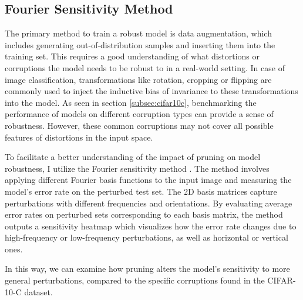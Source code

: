 \subsection{Fourier Sensitivity Method}\label{sec:fourier}

The primary method to train a robust model is data augmentation, which includes generating out-of-distribution samples and inserting them
into the training set. This requires a good understanding of what distortions or corruptions the model needs to be robust to in a real-world setting.
In case of image classification, transformations like rotation, cropping or flipping are commonly used to inject the inductive bias of invariance to these
transformations into the model. As seen in section \ref{subsec:cifar10c}, benchmarking the performance of models on different corruption types can provide
a sense of robustness. However, these common corruptions may not cover all possible features of distortions in the input space. 

To facilitate a better understanding of the impact of pruning on model robustness, I utilize the Fourier sensitivity method \cite{fourier_analysis}. 
The method involves applying different Fourier basis functions to the input image and measuring the model's error rate on the perturbed test set.  
The 2D basis matrices capture perturbations with different frequencies and orientations. By evaluating average error rates on perturbed sets corresponding to
each basis matrix, the method outputs a sensitivity heatmap which visualizes how the error rate changes due to high-frequency or low-frequency perturbations,
as well as horizontal or vertical ones.

In this way, we can examine how pruning alters the model's sensitivity to more general perturbations, compared to the specific corruptions found in the CIFAR-10-C dataset. 